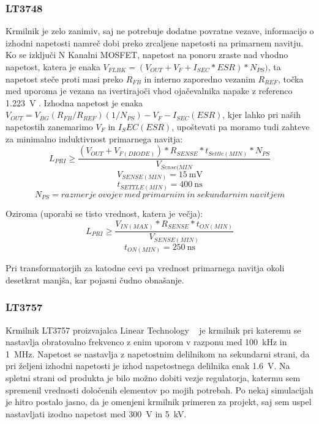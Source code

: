 \documentclass[a4paper,twoside,openright,12pt,slovene]{book}
\begin{document}
	\subsubsection{LT3748} \label{LT3748}
Krmilnik je zelo zanimiv, saj ne potrebuje dodatne povratne vezave, informacijo o izhodni napetosti namreč dobi preko zrcaljene napetosti na primarnem navitju. Ko se izključi N Kanalni MOSFET, napetost na ponoru zraste nad vhodno napetost, katera je enaka \(V_{FLBK} = (V_{OUT} + V_F + I_{SEC} * ESR) * N_{PS}) \), ta napetost steče proti masi preko \(R_{FB}\) in interno zaporedno vezanim \(R_{REF}\), točka med uporoma je vezana na ivertirajoči vhod ojačevalnika napake z referenco \SI{1.223}{\volt} \cite{analog:LT3748}. Izhodna napetost je enaka \(V_{OUT} = V_{BG}(R_{FB} / R_{REF})(1 / N_{PS}) - V_F - I_{SEC} (ESR)\), kjer lahko pri naših napetostih zanemarimo \(V_F\) in \(I_SEC (ESR)\), upoštevati pa moramo tudi zahteve za minimalno induktivnost primarnega navitja:
\[L_{PRI} \geq \frac{(V_{OUT}+V_{F(DIODE)}) * R_{SENSE} * t_{Settle(MIN)} * N_{PS}}{V_{Sense(MIN}}\]
\[V_{SENSE(MIN)}=\SI{15}{\milli\volt}\]
\[t_{SETTLE(MIN)}=\SI{400}{\nano\second}\]
\[N_{PS}=razmerje \: ovojev \: med \: primarnim \: in \: sekundarnim \: navitjem \]

Oziroma (uporabi se tisto vrednost, katera je večja):
\[L_{PRI} \geq \frac{V_{IN(MAX)}*R_{SENSE}*t_{ON(MIN)}}{V_{SENSE(MIN)}}\]
\[t_{ON(MIN)}=\SI{250}{\nano\second}\]

Pri transformatorjih za katodne cevi pa vrednost primarnega navitja okoli desetkrat manjša, kar pojasni čudno obnašanje.

	\subsubsection{LT3757} \label{LT3757}
Krmilnik LT3757 proizvajalca Linear Technology ~\cite{analog:LT3757} je krmilnik pri kateremu se nastavlja obratovalno frekvenco z enim uporom v razponu med \SI{100} {\kilo\hertz} in \SI{1} {\mega\hertz}. Napetost se nastavlja z napetostnim delilnikom na sekundarni strani, da pri željeni izhodni napetosti je izhod napetostnega delilnika enak \SI{1.6} {\volt}. Na spletni strani od produkta je bilo možno dobiti vezje regulatorja, katermu sem spremenil vrednosti določenih elementov po mojih potrebah. Po nekaj simulacijah je hitro postalo jasno, da je omenjeni krmilnik primeren za projekt, saj sem uspel nastavljati izodno napetost med \SI{300}{\volt} in \SI{5}{\kilo\volt}. 
\end{document}

